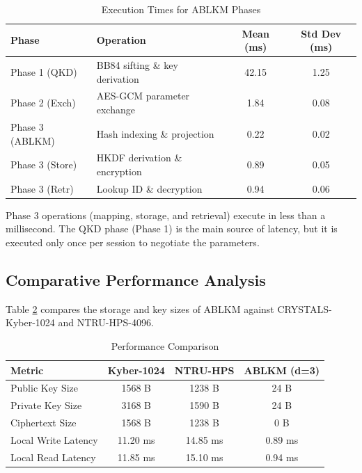 \documentclass[conference,a4paper]{IEEEtran}
\begin{document}
\begin{table}[!ht]
\caption{Execution Times for ABLKM Phases}
\label{tab:benchmarks}
\centering
\begin{tabular}{|p{1.8cm}|p{3.8cm}|c|c|}
\hline
\textbf{Phase} & \textbf{Operation} & \textbf{Mean (ms)} & \textbf{Std Dev (ms)} \\
\hline
Phase 1 (QKD) & BB84 sifting \& key derivation & 42.15 & 1.25 \\
\hline
Phase 2 (Exch) & AES-GCM parameter exchange & 1.84 & 0.08 \\
\hline
Phase 3 (ABLKM) & Hash indexing \& projection & 0.22 & 0.02 \\
\hline
Phase 3 (Store) & HKDF derivation \& encryption & 0.89 & 0.05 \\
\hline
Phase 3 (Retr) & Lookup ID \& decryption & 0.94 & 0.06 \\
\hline
\end{tabular}
\end{table}

Phase 3 operations (mapping, storage, and retrieval) execute in less than a millisecond. The QKD phase (Phase 1) is the main source of latency, but it is executed only once per session to negotiate the parameters.

\subsection{Comparative Performance Analysis}
Table \ref{tab:comparison} compares the storage and key sizes of ABLKM against CRYSTALS-Kyber-1024 and NTRU-HPS-4096.

\begin{table}[!ht]
\caption{Performance Comparison}
\label{tab:comparison}
\centering
\begin{tabular}{|p{2.6cm}|c|c|c|}
\hline
\textbf{Metric} & \textbf{Kyber-1024} & \textbf{NTRU-HPS} & \textbf{ABLKM (d=3)} \\
\hline
Public Key Size & 1568 B & 1238 B & 24 B \\
\hline
Private Key Size & 3168 B & 1590 B & 24 B \\
\hline
Ciphertext Size & 1568 B & 1238 B & 0 B \\
\hline
Local Write Latency & 11.20 ms & 14.85 ms & 0.89 ms \\
\hline
Local Read Latency & 11.85 ms & 15.10 ms & 0.94 ms \\
\hline
\end{tabular}
\end{table}
\end{document}
